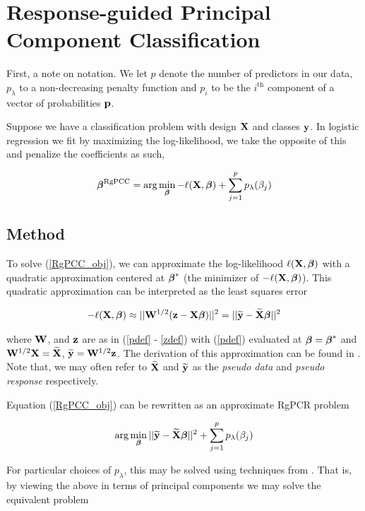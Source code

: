 \documentclass[main.tex]{subfiles}
\begin{document}
\section{Response-guided Principal Component Classification}

First, a note on notation. We let $p$ denote the number of predictors in our data, $p_{\lambda}$ to a non-decreasing penalty function and $p_i$ to be the $i^{\text{th}}$ component of a vector of probabilities $\mathbf{p}$.

Suppose we have a classification problem with design $\mathbf{X}$ and classes $\mathbf{y}$. In logistic regression we fit by maximizing the log-likelihood, we take the opposite of this and penalize the coefficients as such,

\begin{align}
	\boldsymbol \beta^{\text{RgPCC}} = \text{arg} \min_{\boldsymbol \beta} - \ell(\mathbf{X}, \boldsymbol \beta) + \sum_{j = 1}^p p_{\lambda}(\beta_j) \label{RgPCC_obj}
\end{align}

\subsection{Method}
To solve (\ref{RgPCC_obj}), we can approximate the log-likelihood $\ell(\mathbf{X}, \boldsymbol \beta)$ with a quadratic approximation centered at $\boldsymbol \beta^*$ (the minimizer of $- \ell(\mathbf{X}, \boldsymbol \beta)$). This quadratic approximation can be interpreted as the least squares error

\begin{align}
	- \ell(\mathbf{X}, \boldsymbol \beta) \approx ||\mathbf{W}^{1/2} (\mathbf{z} - \mathbf{X} \boldsymbol \beta)||^2 = || \widetilde{\mathbf{y}} - \widetilde{\mathbf{X}} \boldsymbol \beta ||^2
\end{align}

where $\mathbf{W}$, and $\mathbf{z}$ are as in (\ref{pdef} - \ref{zdef}) with (\ref{pdef}) evaluated at $\boldsymbol \beta = \boldsymbol \beta^*$ and $\mathbf{W}^{1/2} \mathbf{X} = \widetilde{\mathbf{X}}$, $\widetilde{\mathbf{y}} = \mathbf{W}^{1/2} \mathbf{z}$. The derivation of this approximation can be found in \cite{wangleng}. Note that, we may often refer to $\widetilde{\mathbf{X}}$ and $\widetilde{\mathbf{y}}$ as the \emph{pseudo data} and \emph{pseudo response} respectively.

Equation (\ref{RgPCC_obj}) can be rewritten as an approximate RgPCR problem

\begin{align}
	\text{arg} \min_{\boldsymbol \beta} || \widetilde{\mathbf{y}} - \widetilde{\mathbf{X}} \boldsymbol \beta ||^2 + \sum_{j = 1}^p p_{\lambda}(\beta_j) \label{RgPCC_obj2}
\end{align}

For particular choices of $p_{\lambda}$, this may be solved using techniques from \cite{langzou}. That is, by viewing the above in terms of principal components we may solve the equivalent problem
\end{document}

